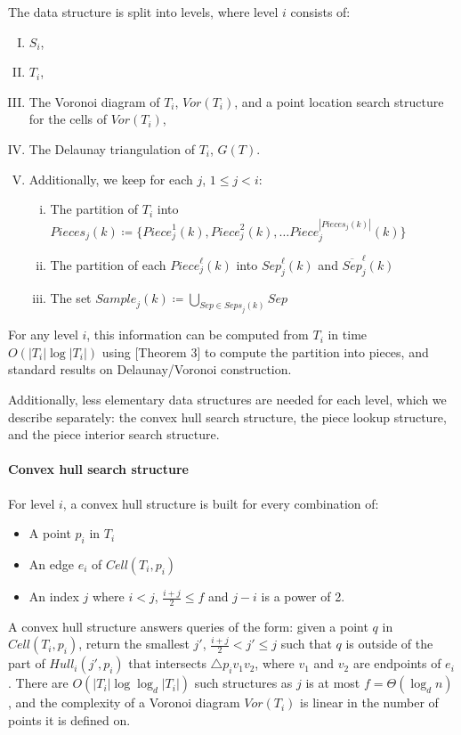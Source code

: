 \documentclass[10pt,a4paper]{amsart}
\newcommand{\Cell}{\mathit{Cell}}
\newcommand{\Sample}{\mathit{Sample}}
\newcommand{\Piece}{\mathit{Piece}}
\newcommand{\Pieces}{\mathit{Pieces}}
\newcommand{\Sep}{\mathit{Sep}}
\newcommand{\Seps}{\mathit{Seps}}
\newcommand{\Hull}{\mathit{Hull}}
\newcommand{\Voron}{\mathit{Vor}}
\begin{document}
The data structure is split into levels, where level $i$ consists of:
\begin{enumerate}[I.]
\item $S_i$,
\item $T_i$,
\item The Voronoi diagram of $T_i$, $\Voron(T_i)$, and a point location search structure for the cells of $\Voron(T_i)$,
\item The Delaunay triangulation of $T_i$, $G(T)$.
\item Additionally, we keep for each $j$, $1\leq j <i$:
    \begin{enumerate}[i.]%
        \item The partition of $T_i$ into $\Pieces_j(k) \coloneqq \{\Piece_j^1(k), \Piece^2_j(k), \ldots  \Piece^{|\Pieces_j(k)|}_j(k)\}$
        \item The partition of each $\Piece_j^\ell(k)$ into $\Sep_j^\ell(k)$ and $\overline{Sep}_j^\ell(k)$
        \item The set $\Sample_j(k) \coloneqq \bigcup_{Sep \in \Seps_j(k)} Sep$
    \end{enumerate}
\end{enumerate}
For any level $i$, this information can be computed from $T_i$ in time $O(|T_i| \log |T_i|)$ using \cite{KleinMS13}[Theorem 3] to compute the partition into pieces, and standard results on Delaunay/Voronoi construction.

Additionally, less elementary data structures are needed for each level, which we describe separately: the convex hull search structure, the piece lookup structure, and the piece interior search structure.

\paragraph*{Convex hull search structure}

For level $i$, a convex hull structure is built for every combination of:
\begin{itemize}
 \setlength{\itemsep}{1pt}
\setlength{\parskip}{0pt}
\setlength{\parsep}{0pt} 
	\item A point $p_i$ in $T_i$
	\item An edge $e_i$ of $\Cell(T_i,p_i)$
	\item An index $j$ where $i < j$, $\frac{i+j}{2}\leq f$ and $j-i$ is a power of 2.
        \end{itemize}
        A convex hull structure answers queries of the form: given a point $q$ in $\Cell(T_i,p_i)$, return the smallest $j'$, $\frac{i+j}{2}< j'\leq j$ such that  $q$ is outside of the part of $\Hull_i(j',p_i)$ that intersects $\triangle p_iv_1v_2$, where $v_1$ and $v_2$ are endpoints of $e_i$. There are $O(|T_i| \log \log_d |T_i|)$ such structures as $j$ is at most $f=\Theta(\log_d n)$, and the complexity of a Voronoi diagram $\Voron(T_i)$ is linear in the number of points it is defined on.
\end{document}
